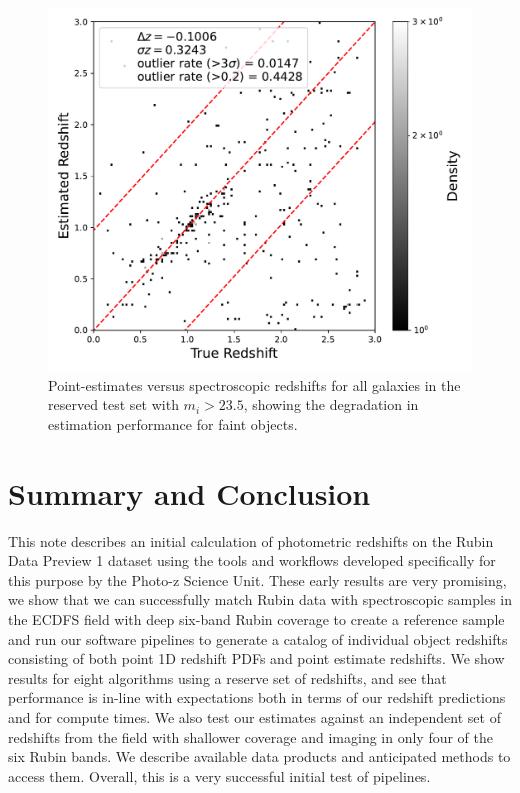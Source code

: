 \begin{figure}
    \centering
    \includegraphics[width=0.45\linewidth]{figures/tpz_scatter_faint.pdf}
    \caption{Point-estimates versus spectroscopic redshifts for all galaxies in the reserved test set with $m_{i} > 23.5$, showing the degradation in estimation performance for faint objects.}
    \label{fig:faint_objects}
\end{figure}


\section{Summary and Conclusion}
\label{sec:summary:0}

This note describes an initial calculation of photometric redshifts on the Rubin Data Preview 1 dataset using the tools and workflows developed specifically for this purpose by the Photo-z Science Unit.  These early results are very promising, we show that we can successfully match Rubin data with spectroscopic samples in the ECDFS field with deep six-band Rubin coverage to create a reference sample and run our software pipelines to generate a catalog of individual object redshifts consisting of both point 1D redshift PDFs and point estimate redshifts.  We show results for eight \photoz algorithms using a reserve set of redshifts, and see that \photoz performance is in-line with expectations both in terms of our redshift predictions and for compute times.  We also test our estimates against an independent set of redshifts from the  field with shallower coverage and imaging in only four of the six Rubin bands.  We describe available data products and anticipated methods to access them.  Overall, this is a very successful initial test of \photoz pipelines.

